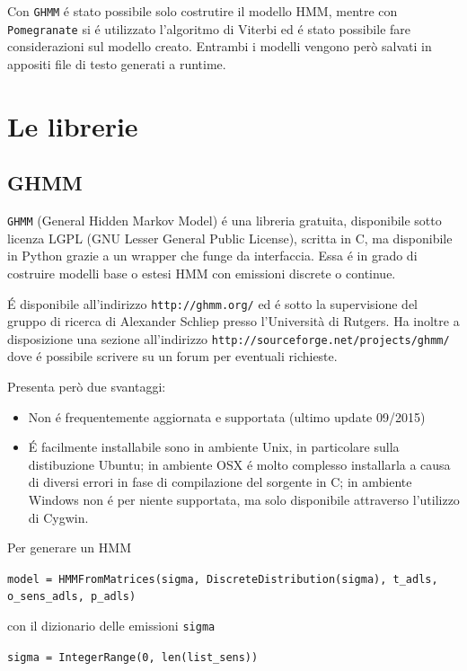 \documentclass[12pt, a4paper]{scrartcl}
\begin{document}
Con \texttt{GHMM} é stato possibile solo costrutire il modello HMM, mentre con \texttt{Pomegranate} si é utilizzato l'algoritmo di Viterbi ed é stato possibile fare considerazioni sul modello creato.
Entrambi i modelli vengono però salvati in appositi file di testo generati a runtime.

\section*{Le librerie}
\subsection*{GHMM}
\texttt{GHMM} (General Hidden Markov Model) é una libreria gratuita, disponibile sotto licenza LGPL (GNU Lesser General Public License), scritta in C, ma disponibile in Python grazie a un wrapper che funge da interfaccia. Essa é in grado di costruire modelli base o estesi HMM con emissioni discrete o continue. 

É disponibile all'indirizzo \texttt{http://ghmm.org/} ed é sotto la supervisione del gruppo di ricerca di Alexander Schliep presso l'Università di Rutgers. Ha inoltre a disposizione una sezione all'indirizzo \texttt{http://sourceforge.net/projects/ghmm/} dove é possibile scrivere su un forum per eventuali richieste.

Presenta però due svantaggi:
\begin{itemize}
\item Non é frequentemente aggiornata e supportata (ultimo update 09/2015)
\item É facilmente installabile sono in ambiente Unix, in particolare sulla distibuzione Ubuntu; in ambiente OSX é molto complesso installarla a causa di diversi errori in fase di compilazione del sorgente in C; in ambiente Windows non é per niente supportata, ma solo disponibile attraverso l'utilizzo di Cygwin.
\end{itemize}

Per generare un HMM
\begin{center}\begin{addmargin}[2em]{2em}
\texttt{model = HMMFromMatrices(sigma, DiscreteDistribution(sigma), t\_adls, o\_sens\_adls, p\_adls)}
\end{addmargin}\end{center}

con il dizionario delle emissioni \texttt{sigma}
\begin{center}\begin{addmargin}[2em]{2em}
\texttt{sigma = IntegerRange(0, len(list\_sens))}
\end{addmargin}\end{center} 
\end{document}
